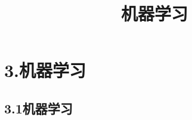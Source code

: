\documentclass[9pt,t]{beamer} %
\begin{document}
\section{3.机器学习}

\begin{frame}
\tableofcontents[currentsection] 
\end{frame}

\subsection{3.1机器学习}
\title{机器学习}

\end{document}
